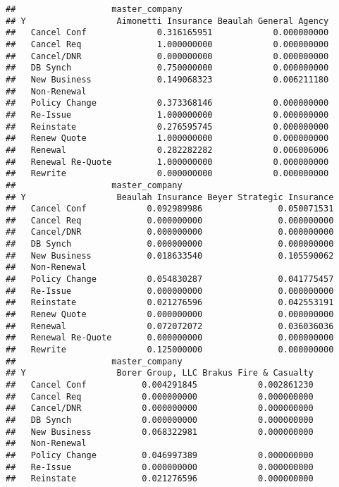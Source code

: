 \documentclass[]{article}
\begin{document}
\begin{verbatim}
##                   master_company
## Y                  Aimonetti Insurance Beaulah General Agency
##   Cancel Conf              0.316165951            0.000000000
##   Cancel Req               1.000000000            0.000000000
##   Cancel/DNR               0.000000000            0.000000000
##   DB Synch                 0.750000000            0.000000000
##   New Business             0.149068323            0.006211180
##   Non-Renewal                                                
##   Policy Change            0.373368146            0.000000000
##   Re-Issue                 1.000000000            0.000000000
##   Reinstate                0.276595745            0.000000000
##   Renew Quote              1.000000000            0.000000000
##   Renewal                  0.282282282            0.006006006
##   Renewal Re-Quote         1.000000000            0.000000000
##   Rewrite                  0.000000000            0.000000000
##                   master_company
## Y                  Beaulah Insurance Beyer Strategic Insurance
##   Cancel Conf            0.092989986               0.050071531
##   Cancel Req             0.000000000               0.000000000
##   Cancel/DNR             0.000000000               0.000000000
##   DB Synch               0.000000000               0.000000000
##   New Business           0.018633540               0.105590062
##   Non-Renewal                                                 
##   Policy Change          0.054830287               0.041775457
##   Re-Issue               0.000000000               0.000000000
##   Reinstate              0.021276596               0.042553191
##   Renew Quote            0.000000000               0.000000000
##   Renewal                0.072072072               0.036036036
##   Renewal Re-Quote       0.000000000               0.000000000
##   Rewrite                0.125000000               0.000000000
##                   master_company
## Y                  Borer Group, LLC Brakus Fire & Casualty
##   Cancel Conf           0.004291845            0.002861230
##   Cancel Req            0.000000000            0.000000000
##   Cancel/DNR            0.000000000            0.000000000
##   DB Synch              0.000000000            0.000000000
##   New Business          0.068322981            0.000000000
##   Non-Renewal                                             
##   Policy Change         0.046997389            0.000000000
##   Re-Issue              0.000000000            0.000000000
##   Reinstate             0.021276596            0.000000000

\end{verbatim}
\end{document}
